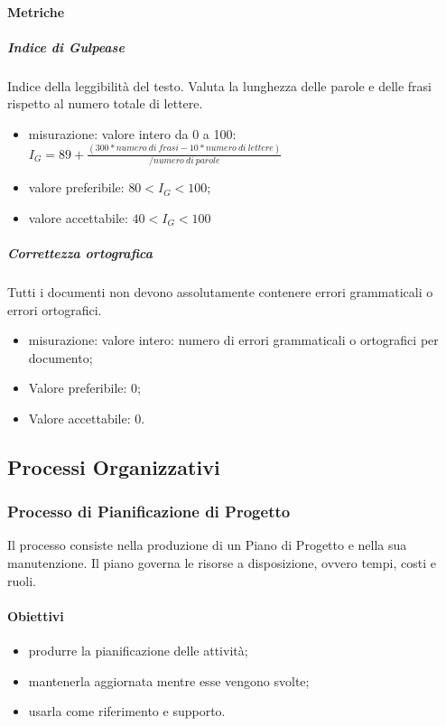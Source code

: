 		\paragraph{Metriche}
			\subparagraph{Indice di Gulpease}
			Indice della leggibilità del testo. Valuta la lunghezza delle parole e delle frasi rispetto al numero totale di lettere. 
			\begin{itemize}
				\item misurazione: valore intero da 0 a 100:\newline 	
				$I_G = 89+ \frac{(300 * numero\ di\ frasi - 10 * numero\ di\ lettere)}{/numero\ di\ parole}$	
				\item valore preferibile: $80 < I_G < 100$;
				\item valore accettabile: $40 < I_G < 100$	
			\end{itemize}
			\subparagraph{Correttezza ortografica}
			Tutti i documenti non devono assolutamente contenere errori grammaticali o errori ortografici. 
			\begin{itemize}
				\item misurazione: valore intero: numero di errori grammaticali o ortografici per documento;
				\item Valore preferibile: 0;
				\item Valore accettabile: 0.
			\end{itemize}
			
\subsection{Processi Organizzativi}
	\subsubsection{Processo di Pianificazione di Progetto}
	Il processo consiste nella produzione di un Piano di Progetto e nella sua manutenzione. Il piano governa le risorse a disposizione, ovvero tempi, costi e ruoli.
		\paragraph{Obiettivi}
		\begin{itemize}
			\item produrre la pianificazione delle attività;
			\item mantenerla aggiornata mentre esse vengono svolte;
			\item usarla come riferimento e supporto.
		\end{itemize}
